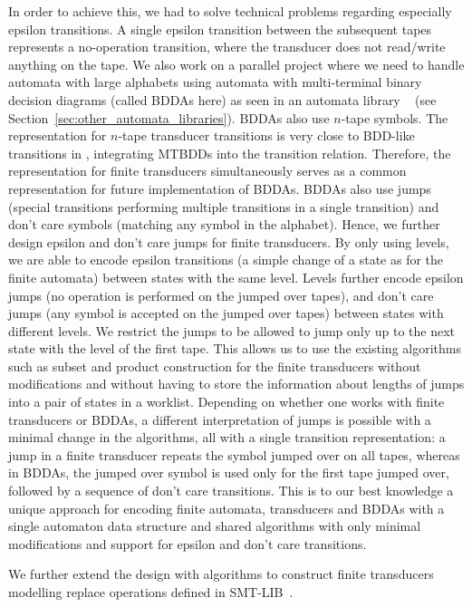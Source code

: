In order to achieve this, we had to solve technical problems regarding especially epsilon transitions.
A single epsilon transition between the subsequent tapes represents a no-operation transition, where the transducer does not read/write anything on the tape.
We also work on a parallel project where we need to handle automata with large alphabets using automata with multi-terminal binary decision diagrams (called BDDAs here) as seen in an automata library \mona~\cite{mona} (see Section~\ref{sec:other_automata_libraries}).
BDDAs also use $n$-tape symbols.
The representation for $n$-tape transducer transitions is very close to BDD-like transitions in \mona, integrating MTBDDs into the transition relation.
Therefore, the representation for finite transducers simultaneously serves as a common representation for future implementation of BDDAs.
BDDAs also use jumps (special transitions performing multiple transitions in a single transition) and don't care symbols (matching any symbol in the alphabet).
Hence, we further design epsilon and don't care jumps for finite transducers.
By only using levels, we are able to encode epsilon transitions (a simple change of a state as for the finite automata) between states with the same level. Levels further encode epsilon jumps (no operation is performed on the jumped over tapes), and don't care jumps (any symbol is accepted on the jumped over tapes) between states with different levels.
We restrict the jumps to be allowed to jump only up to the next state with the level of the first tape.
This allows us to use the existing algorithms such as subset and product construction for the finite transducers without modifications and without having to store the information about lengths of jumps into a pair of states in a worklist.
Depending on whether one works with finite transducers or BDDAs, a different interpretation of jumps is possible with a minimal change in the algorithms, all with a single transition representation: a jump in a finite transducer repeats the symbol jumped over on all tapes, whereas in BDDAs, the jumped over symbol is used only for the first tape jumped over, followed by a sequence of don't care transitions.
This is to our best knowledge a unique approach for encoding finite automata, transducers and BDDAs with a single automaton data structure and shared algorithms with only minimal modifications and support for epsilon and don't care transitions.

We further extend the design with algorithms to construct finite transducers modelling replace operations defined in SMT-LIB~\cite{SMTLIB}.


